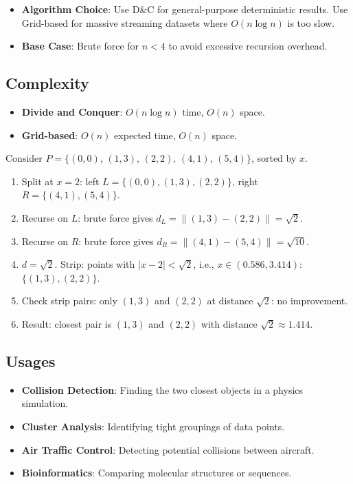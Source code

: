 \begin{itemize}
\item \textbf{Algorithm Choice}: Use D\&C for general-purpose deterministic results. Use Grid-based for massive streaming datasets where $O(n \log n)$ is too slow.
\item \textbf{Base Case}: Brute force for $n < 4$ to avoid excessive recursion overhead.
\end{itemize}

\subsection{Complexity}

\begin{itemize}
\item \textbf{Divide and Conquer}: $O(n \log n)$ time, $O(n)$ space.
\item \textbf{Grid-based}: $O(n)$ expected time, $O(n)$ space.
\end{itemize}

\begin{example}\label{ex:closest_pair}
Consider $P = \{(0,0),\, (1,3),\, (2,2),\, (4,1),\, (5,4)\}$, sorted by $x$.
\begin{enumerate}
\item Split at $x = 2$: left $L = \{(0,0),(1,3),(2,2)\}$, right $R = \{(4,1),(5,4)\}$.
\item Recurse on $L$: brute force gives $d_L = \|(1,3)-(2,2)\| = \sqrt{2}$.
\item Recurse on $R$: brute force gives $d_R = \|(4,1)-(5,4)\| = \sqrt{10}$.
\item $d = \sqrt{2}$. Strip: points with $|x - 2| < \sqrt{2}$, i.e., $x \in (0.586, 3.414)$: $\{(1,3),(2,2)\}$.
\item Check strip pairs: only $(1,3)$ and $(2,2)$ at distance $\sqrt{2}$: no improvement.
\item Result: closest pair is $(1,3)$ and $(2,2)$ with distance $\sqrt{2} \approx 1.414$.
\end{enumerate}
\end{example}

\subsection{Usages}

\begin{itemize}
\item \textbf{Collision Detection}: Finding the two closest objects in a physics simulation.
\item \textbf{Cluster Analysis}: Identifying tight groupings of data points.
\item \textbf{Air Traffic Control}: Detecting potential collisions between aircraft.
\item \textbf{Bioinformatics}: Comparing molecular structures or sequences.
\end{itemize}

